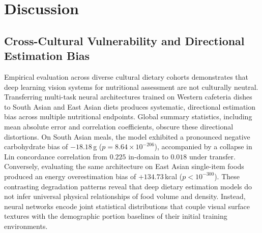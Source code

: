 \documentclass[utf8]{FrontiersinVancouver}
\begin{document}
\begin{table}[tbp]
\centering
\small
\caption{\textbf{Empirical Remediation of Cultural Bias via Few-Shot Localized Calibration.} Clinical carbohydrate safety metrics and energy errors on the independent FoodBD test cohort ($N=180$) across sample budgets ($K=0, 20, 50, 100$). Best values per column are highlighted in bold.}
\label{tab:few_shot_calibration}
\vspace{4pt}
\end{table}

\section{Discussion}

\subsection{Cross-Cultural Vulnerability and Directional Estimation Bias}

Empirical evaluation across diverse cultural dietary cohorts demonstrates that deep learning vision systems for nutritional assessment are not culturally neutral. Transferring multi-task neural architectures trained on Western cafeteria dishes to South Asian and East Asian diets produces systematic, directional estimation bias across multiple nutritional endpoints. Global summary statistics, including mean absolute error and correlation coefficients, obscure these directional distortions. On South Asian meals, the model exhibited a pronounced negative carbohydrate bias of $-18.18$\,g ($p = 8.64 \times 10^{-206}$), accompanied by a collapse in Lin concordance correlation from $0.225$ in-domain to $0.018$ under transfer. Conversely, evaluating the same architecture on East Asian single-item foods produced an energy overestimation bias of $+134.73$\,kcal ($p < 10^{-300}$). These contrasting degradation patterns reveal that deep dietary estimation models do not infer universal physical relationships of food volume and density. Instead, neural networks encode joint statistical distributions that couple visual surface textures with the demographic portion baselines of their initial training environments.
\end{document}
